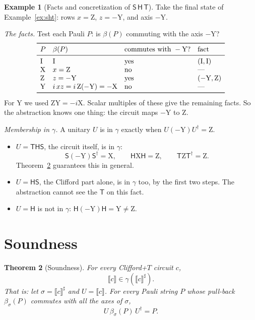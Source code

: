 \documentclass[11pt]{article}
\newtheorem{theorem}{Theorem}[section]
\theoremstyle{definition}
\newtheorem{example}[theorem]{Example}
\theoremstyle{remark}
\newcommand{\sem}[1]{\llbracket #1 \rrbracket}
\newcommand{\abs}[1]{\llbracket #1 \rrbracket^{\sharp}}
\newcommand{\adj}{^{\dagger}}
\newcommand{\gam}{\gamma}
\newcommand{\back}{\beta}
\newcommand{\tI}{\mathrm{I}}
\newcommand{\tX}{\mathrm{X}}
\newcommand{\tY}{\mathrm{Y}}
\newcommand{\tZ}{\mathrm{Z}}
\newcommand{\gate}[1]{\mathsf{#1}}
\begin{document}
\begin{example}[Facts and concretization of $\gate S\,\gate H\,\gate T$]\label{ex:sht-gamma}
Take the final state of Example~\ref{ex:sht}: rows $x = \tZ$, $z = -\tY$, and axis $-\tY$.

\emph{The facts.} Test each Pauli $P$: is $\back(P)$ commuting with the axis $-\tY$?
\[
\begin{array}{llll}
\toprule
P & \back(P) & \text{commutes with } -\tY? & \text{fact} \\
\midrule
\tI & \tI & \text{yes} & (\tI, \tI) \\
\tX & x = \tZ & \text{no} & \text{---} \\
\tZ & z = -\tY & \text{yes} & (-\tY, \tZ) \\
\tY & i\,xz = i\,\tZ(-\tY) = -\tX & \text{no} & \text{---} \\
\bottomrule
\end{array}
\]
For $\tY$ we used $\tZ\tY = -i\tX$. Scalar multiples of these give the remaining facts. So
the abstraction knows one thing: the circuit maps $-\tY$ to $\tZ$.

\emph{Membership in $\gam$.} A unitary $U$ is in $\gam$ exactly when $U(-\tY)U\adj = \tZ$.
\begin{itemize}[nosep]
  \item $U = \gate T\gate H\gate S$, the circuit itself, is in $\gam$:
  \[
    \gate S(-\tY)\gate S\adj = \tX,\qquad \gate H\tX\gate H = \tZ,\qquad
    \gate T\tZ\gate T\adj = \tZ .
  \]
  Theorem~\ref{thm:sound} guarantees this in general.
  \item $U = \gate H\gate S$, the Clifford part alone, is in $\gam$ too, by the first two
  steps. The abstraction cannot see the $\gate T$ on this fact.
  \item $U = \gate H$ is not in $\gam$: $\gate H(-\tY)\gate H = \tY \neq \tZ$.
\end{itemize}
\end{example}

\section{Soundness}

\begin{theorem}[Soundness]\label{thm:sound}
For every Clifford+$T$ circuit $c$,
\[
  \sem{c} \in \gam(\abs{c}).
\]
That is: let $\sigma = \abs{c}$ and $U = \sem{c}$. For every Pauli string $P$ whose
pull-back $\back_\sigma(P)$ commutes with all the axes of $\sigma$,
\[
  U\, \back_\sigma(P)\, U\adj = P .
\]
\end{theorem}
\end{document}
